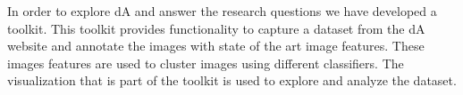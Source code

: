 In order to explore dA and answer the research questions we have developed a toolkit.
This toolkit provides functionality to capture a dataset from the dA website and annotate the images with state of the art image features.
These images features are used to cluster images using different classifiers.
The visualization that is part of the toolkit is used to explore and analyze the dataset.